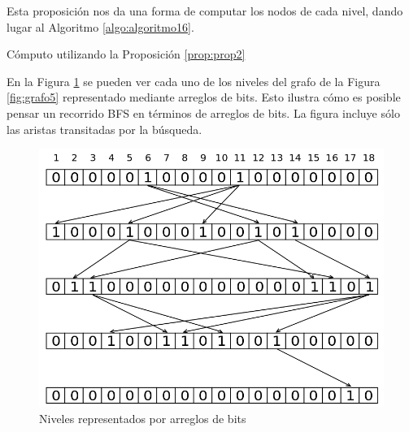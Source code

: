 Esta proposición nos da una forma de computar los nodos de cada nivel, dando lugar al Algoritmo \ref{algo:algoritmo16}. 

\begin{algorithm}
	\DontPrintSemicolon
 	\BlankLine
\caption{Cómputo utilizando la Proposición \ref{prop:prop2}}
\label{algo:algoritmo16}
\end{algorithm}

En la Figura \ref{fig:arreglos_niveles} se pueden ver cada uno de los niveles del grafo de la Figura \ref{fig:grafo5} representado mediante arreglos de bits. Esto ilustra cómo es posible pensar un recorrido BFS en términos de arreglos de bits. La figura incluye sólo las aristas transitadas por la búsqueda.

\begin{figure}[h]
\centering
\includegraphics[scale=0.3]{imagenes/bfs.png}
\caption{Niveles representados por arreglos de bits}
\label{fig:arreglos_niveles}
\end{figure}

